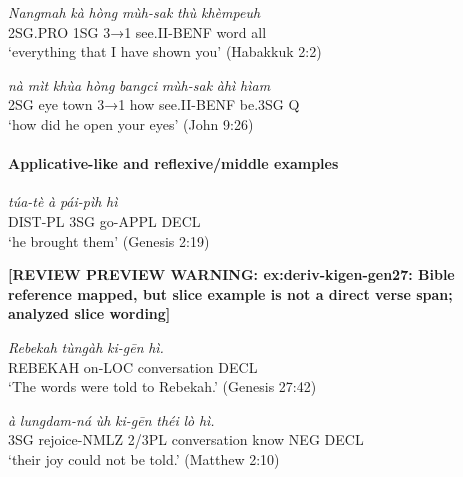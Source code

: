 \documentclass[
  11pt,
  a4paper,
]{article}
\newcommand{\tdimword}[1]{\textit{#1}}
\renewcommand{\textsc}[1]{{\footnotesize\MakeUppercase{#1}}}
\newcommand{\glossquote}[1]{`#1'}
\newcommand{\reviewwarninginline}[1]{\textbf{#1}\par\smallskip}
\begin{document}
\begin{exe}
\ex \label{ex:deriv-muhsak-hab2}
\gll \tdimword{Nangmah} \tdimword{kà} \tdimword{hòng} \tdimword{mùh-sak} \tdimword{thù} \tdimword{khèmpeuh} \\
     \textsc{2sg}.\textsc{pro} \textsc{1sg} \textsc{3→1} see.\textsc{ii}-\textsc{benf} word all \\
\glt \glossquote{everything that I have shown you} (Habakkuk 2:2)
\end{exe}

\begin{exe}
\ex \label{ex:deriv-muhsak-john9}
\gll \tdimword{nà} \tdimword{mìt} \tdimword{khùa} \tdimword{hòng} \tdimword{bangci} \tdimword{mùh-sak} \tdimword{àhì} \tdimword{hìam} \\
     \textsc{2sg} eye town \textsc{3→1} how see.\textsc{ii}-\textsc{benf} be.\textsc{3sg} \textsc{q} \\
\glt \glossquote{how did he open your eyes} (John 9:26)
\end{exe}

\paragraph{Applicative-like and reflexive/middle
examples}\label{applicative-like-and-reflexivemiddle-examples}

\begin{exe}
\ex \label{ex:deriv-paipih-gen2}
\gll \tdimword{túa-tè} \tdimword{à} \tdimword{pái-pìh} \tdimword{hì} \\
     \textsc{dist}-\textsc{pl} \textsc{3sg} go-\textsc{appl} \textsc{decl} \\
\glt \glossquote{he brought them} (Genesis 2:19)
\end{exe}

\begin{exe}
\ex \label{ex:deriv-kigen-gen27}
\reviewwarninginline{[REVIEW PREVIEW WARNING: ex:deriv-kigen-gen27: Bible reference mapped, but slice example is not a direct verse span; analyzed slice wording]}
\gll \tdimword{Rebekah} \tdimword{tùngàh} \tdimword{ki-gēn} \tdimword{hì.} \\
     \textsc{rebekah} on-\textsc{loc} conversation \textsc{decl} \\
\glt \glossquote{The words were told to Rebekah.} (Genesis 27:42)
\end{exe}

\begin{exe}
\ex \label{ex:deriv-kigen-matt2}
\gll \tdimword{à} \tdimword{lungdam-ná} \tdimword{ùh} \tdimword{ki-gēn} \tdimword{théi} \tdimword{lò} \tdimword{hì.} \\
     \textsc{3sg} rejoice-\textsc{nmlz} 2/3PL conversation know \textsc{neg} \textsc{decl} \\
\glt \glossquote{their joy could not be told.} (Matthew 2:10)
\end{exe}
\end{document}
